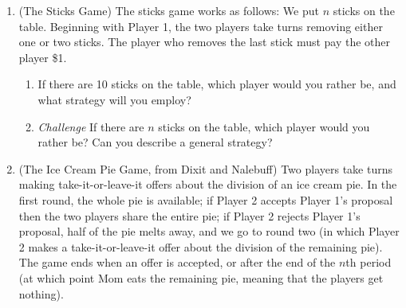\begin{enumerate}
\begin{enumerate}
    \end{enumerate}
















\item (The Sticks Game) The sticks game works as follows: We put $n$ sticks on the table. Beginning with Player 1, the two players take turns removing either one or two sticks. The player who removes the last stick must pay the other player \$1.

    \begin{enumerate}

    \item If there are 10 sticks on the table, which player would you rather be, and what strategy will you employ?


    \item \emph{Challenge} If there are $n$ sticks on the table, which player would you rather be? Can you describe a general strategy?



    \end{enumerate}








\item (The Ice Cream Pie Game, from Dixit and Nalebuff) Two players take turns making take-it-or-leave-it offers about the division of an ice cream pie. In the first round, the whole pie is available; if Player 2 accepts Player 1's proposal then the two players share the entire pie; if Player 2 rejects Player 1's proposal, half of the pie melts away, and we go to round two (in which Player 2 makes a take-it-or-leave-it offer about the division of the remaining pie). The game ends when an offer is accepted, or after the end of the $n$th period (at which point Mom eats the remaining pie, meaning that the players get nothing).


\end{enumerate}
